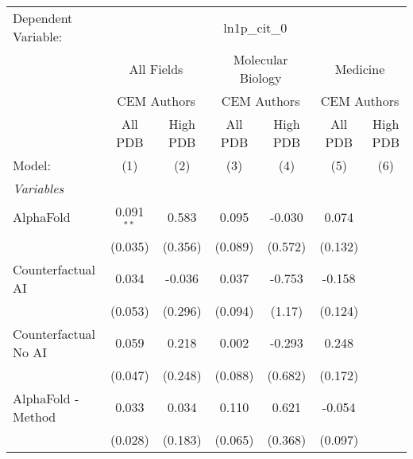 \begingroup
\centering
\begin{tabular}{lcccccc}
   \tabularnewline \midrule \midrule
   Dependent Variable: & \multicolumn{6}{c}{ln1p\_cit\_0}\\
 & \multicolumn{2}{c}{All Fields} & \multicolumn{2}{c}{Molecular Biology} & \multicolumn{2}{c}{Medicine} \\
\cmidrule(lr){2-3} \cmidrule(lr){4-5} \cmidrule(lr){6-7}
 & \multicolumn{2}{c}{CEM Authors} & \multicolumn{2}{c}{CEM Authors} & \multicolumn{2}{c}{CEM Authors} \\
\cmidrule(lr){2-3} \cmidrule(lr){4-5} \cmidrule(lr){6-7}
 & \multicolumn{1}{c}{All PDB} & \multicolumn{1}{c}{High PDB} & \multicolumn{1}{c}{All PDB} & \multicolumn{1}{c}{High PDB} & \multicolumn{1}{c}{All PDB} & \multicolumn{1}{c}{High PDB} \\
\cmidrule(lr){2-2} \cmidrule(lr){3-3} \cmidrule(lr){4-4} \cmidrule(lr){5-5} \cmidrule(lr){6-6} \cmidrule(lr){7-7}
   Model:                                                     & (1)            & (2)     & (3)            & (4)     & (5)            & (6)\\  
   \midrule
   \emph{Variables}\\
   AlphaFold                                                  & 0.091$^{**}$   & 0.583   & 0.095          & -0.030  & 0.074          &   \\   
                                                              & (0.035)        & (0.356) & (0.089)        & (0.572) & (0.132)        &   \\   
   Counterfactual AI                                          & 0.034          & -0.036  & 0.037          & -0.753  & -0.158         &   \\   
                                                              & (0.053)        & (0.296) & (0.094)        & (1.17)  & (0.124)        &   \\   
   Counterfactual No AI                                       & 0.059          & 0.218   & 0.002          & -0.293  & 0.248          &   \\   
                                                              & (0.047)        & (0.248) & (0.088)        & (0.682) & (0.172)        &   \\   
   AlphaFold - Method                                         & 0.033          & 0.034   & 0.110          & 0.621   & -0.054         &   \\   
                                                              & (0.028)        & (0.183) & (0.065)        & (0.368) & (0.097)        &   \\   

\end{tabular}
